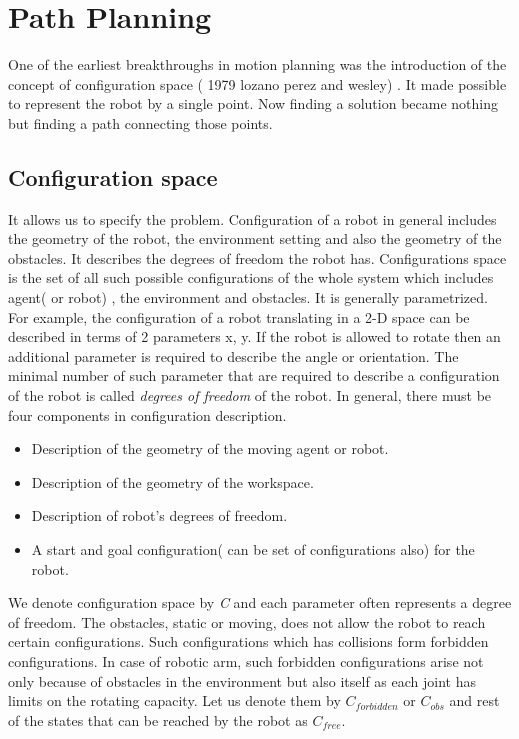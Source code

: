 \documentclass[MTech]{iitmdiss}
\begin{document}
\chapter{Path Planning}

One of the earliest breakthroughs in motion planning was the introduction of the concept of configuration space (  1979 lozano perez and wesley) .  It made possible to represent the robot by a single point. Now finding a solution became nothing but finding a path connecting those points. 

\section{Configuration space}
  
It allows us to specify the problem. Configuration of a robot in general includes the geometry of the robot, the environment setting and also the geometry of the obstacles. It describes the degrees of freedom the robot has. Configurations space is the set of all such possible configurations of the whole system which includes agent( or robot) , the environment and obstacles. It is generally parametrized. For example, the configuration of a robot translating in a 2-D space can be described in terms of 2 parameters x, y. If the robot is allowed to rotate then an additional parameter is required to describe the angle or orientation. The minimal number of such parameter that are required to describe a configuration of the robot is called \textit{degrees of freedom} of the robot. 
In general, there must be four components in configuration description.

\begin{itemize}
\item Description of the geometry of the moving agent or robot.
\item Description of the geometry of the workspace.
\item Description of robot's degrees of freedom.
\item A start and goal configuration( can be set of configurations also)  for the robot.
\end{itemize}

We denote configuration space by \emph{C} and each parameter often represents a degree of freedom.
The obstacles, static or moving, does not allow the robot to reach certain configurations. Such configurations which has collisions form forbidden configurations. In case of robotic arm, such forbidden configurations arise not only because of obstacles in the environment but also itself as each joint has limits on the rotating capacity. Let us denote them by \emph{$C_{forbidden}$} or \emph{$C_{obs}$} and rest of the states that can be reached by the robot as \emph{$C_{free}$}. 
\end{document}
